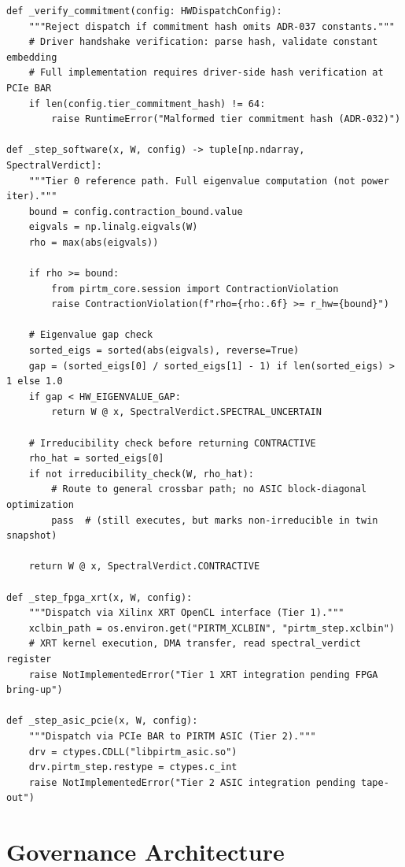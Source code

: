 \documentclass[12pt,letterpaper]{article}
\theoremstyle{plain}
\theoremstyle{definition}
\theoremstyle{remark}
\begin{document}
\begin{lstlisting}[style=pythonstyle, caption={\texttt{pirtm\_core/hw\_dispatch.py} --- Gate U hardware dispatch layer}, label=lst:dispatch]
def _verify_commitment(config: HWDispatchConfig):
    """Reject dispatch if commitment hash omits ADR-037 constants."""
    # Driver handshake verification: parse hash, validate constant embedding
    # Full implementation requires driver-side hash verification at PCIe BAR
    if len(config.tier_commitment_hash) != 64:
        raise RuntimeError("Malformed tier commitment hash (ADR-032)")

def _step_software(x, W, config) -> tuple[np.ndarray, SpectralVerdict]:
    """Tier 0 reference path. Full eigenvalue computation (not power iter)."""
    bound = config.contraction_bound.value
    eigvals = np.linalg.eigvals(W)
    rho = max(abs(eigvals))

    if rho >= bound:
        from pirtm_core.session import ContractionViolation
        raise ContractionViolation(f"rho={rho:.6f} >= r_hw={bound}")

    # Eigenvalue gap check
    sorted_eigs = sorted(abs(eigvals), reverse=True)
    gap = (sorted_eigs[0] / sorted_eigs[1] - 1) if len(sorted_eigs) > 1 else 1.0
    if gap < HW_EIGENVALUE_GAP:
        return W @ x, SpectralVerdict.SPECTRAL_UNCERTAIN

    # Irreducibility check before returning CONTRACTIVE
    rho_hat = sorted_eigs[0]
    if not irreducibility_check(W, rho_hat):
        # Route to general crossbar path; no ASIC block-diagonal optimization
        pass  # (still executes, but marks non-irreducible in twin snapshot)

    return W @ x, SpectralVerdict.CONTRACTIVE

def _step_fpga_xrt(x, W, config):
    """Dispatch via Xilinx XRT OpenCL interface (Tier 1)."""
    xclbin_path = os.environ.get("PIRTM_XCLBIN", "pirtm_step.xclbin")
    # XRT kernel execution, DMA transfer, read spectral_verdict register
    raise NotImplementedError("Tier 1 XRT integration pending FPGA bring-up")

def _step_asic_pcie(x, W, config):
    """Dispatch via PCIe BAR to PIRTM ASIC (Tier 2)."""
    drv = ctypes.CDLL("libpirtm_asic.so")
    drv.pirtm_step.restype = ctypes.c_int
    raise NotImplementedError("Tier 2 ASIC integration pending tape-out")
\end{lstlisting}

\section{Governance Architecture}
\end{document}
